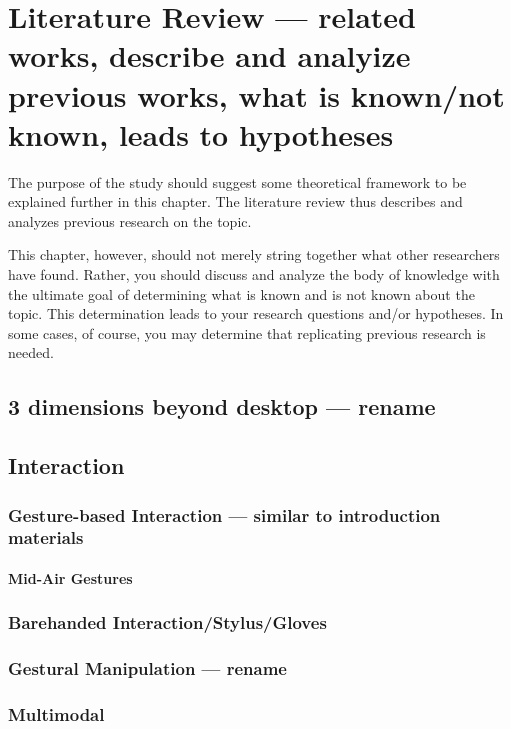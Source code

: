 \chapter{Literature Review --- related works, describe and analyize previous works, what is known/not known, leads to hypotheses}

The purpose of the study should suggest some theoretical framework to be explained further in this chapter.
The literature review thus describes and analyzes previous research on the topic.

This chapter, however, should not merely string together what other researchers have found. Rather, you should
discuss and analyze the body of knowledge with the ultimate goal of determining what is known and is not known
about the topic. This determination leads to your research questions and/or hypotheses. In some cases, of course,
you may determine that replicating previous research is needed. 

\section{3 dimensions beyond desktop --- rename}

\section{Interaction}

\subsection{Gesture-based Interaction --- similar to introduction materials}

\subsubsection{Mid-Air Gestures}

\subsection{Barehanded Interaction/Stylus/Gloves}

\subsection{Gestural Manipulation --- rename}

\subsection{Multimodal}

